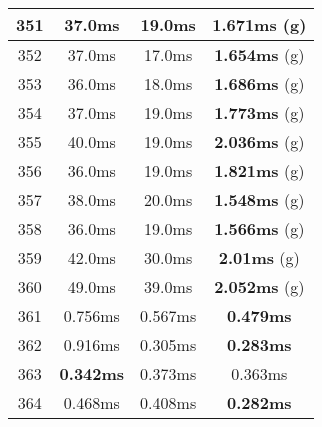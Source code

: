 \begin{table}[H]
\begin{minipage}{5cm}
{\begin{tabular}{|c|c|c|c|}
\hline
351 & 37.0ms & 19.0ms & \textbf{1.671ms} (g) \\
\hline
352 & 37.0ms & 17.0ms & \textbf{1.654ms} (g) \\
\hline
353 & 36.0ms & 18.0ms & \textbf{1.686ms} (g) \\
\hline
354 & 37.0ms & 19.0ms & \textbf{1.773ms} (g) \\
\hline
355 & 40.0ms & 19.0ms & \textbf{2.036ms} (g) \\
\hline
356 & 36.0ms & 19.0ms & \textbf{1.821ms} (g) \\
\hline
357 & 38.0ms & 20.0ms & \textbf{1.548ms} (g) \\
\hline
358 & 36.0ms & 19.0ms & \textbf{1.566ms} (g) \\
\hline
359 & 42.0ms & 30.0ms & \textbf{2.01ms} (g) \\
\hline
360 & 49.0ms & 39.0ms & \textbf{2.052ms} (g) \\
\hline
361 & 0.756ms & 0.567ms & \textbf{0.479ms} \\
\hline
362 & 0.916ms & 0.305ms & \textbf{0.283ms} \\
\hline
363 & \textbf{0.342ms} & 0.373ms & 0.363ms \\
\hline
364 & 0.468ms & 0.408ms & \textbf{0.282ms} \\
\hline
\end{tabular}
}
\end{minipage}
\end{table}

\begin{table}[H]
\begin{minipage}{5cm} 
\end{minipage}
\caption{Tempi di esecuzione in millisecondi dei problemi Disjunctive Binding di Vampire, 1b naif e 1b}
\end{table}
